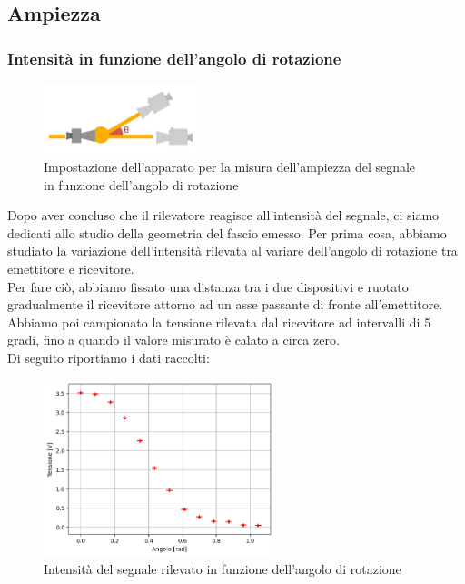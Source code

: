 \documentclass[letterpaper,12pt]{article}
\begin{document}
\subsection{Ampiezza}
\subsubsection{Intensità in funzione dell'angolo di rotazione}

\begin{figure}[h!]
    \centering
    \includegraphics[width = 0.4\textwidth]{ampiezza rotazione.jpg}
    \caption{Impostazione dell'apparato per la misura dell'ampiezza del segnale in funzione dell'angolo di rotazione}
    \label{fig:ampiezza_angolo}
\end{figure}

Dopo aver concluso che il rilevatore reagisce all'intensità del segnale, ci siamo dedicati allo studio della geometria
del fascio emesso. Per prima cosa, abbiamo studiato la variazione dell'intensità rilevata al variare dell'angolo di rotazione
tra emettitore e ricevitore.\\
Per fare ciò, abbiamo fissato una distanza tra i due dispositivi e ruotato gradualmente il ricevitore attorno ad un asse
passante di fronte all'emettitore. Abbiamo poi campionato la tensione rilevata dal ricevitore ad intervalli di 5 gradi, fino a quando
il valore misurato è calato a circa zero.\\
Di seguito riportiamo i dati raccolti:

\begin{figure}[h!]
    \centering
    \includegraphics[width = 0.6\textwidth]{dati_rotazione.png}
    \caption{Intensità del segnale rilevato in funzione dell'angolo di rotazione}
    \label{fig:rotazione}
\end{figure}
\end{document}
